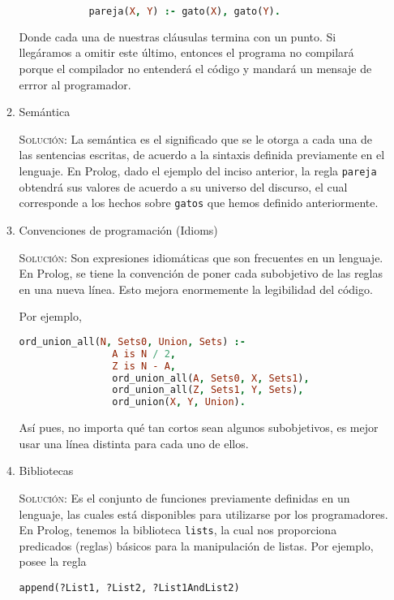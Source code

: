 \documentclass[letterpaper,11pt]{article}
\begin{document}
\begin{enumerate}
\begin{enumerate}
\begin{lstlisting}[language=Prolog]
            % Regla
            pareja(X, Y) :- gato(X), gato(Y).
        \end{lstlisting}
        
        Donde cada una de nuestras cláusulas termina con un punto. Si llegáramos
        a omitir este último, entonces el programa no compilará porque el 
        compilador no entenderá el código y mandará un mensaje de errror al 
        programador.

        \item Semántica

        \textsc{Solución:} La semántica es el significado que se le otorga a 
        cada una de las sentencias escritas, de acuerdo a la sintaxis definida 
        previamente en el lenguaje. En Prolog, dado el ejemplo del inciso 
        anterior, la regla \texttt{pareja} obtendrá sus valores de acuerdo a su 
        universo del discurso, el cual corresponde a los hechos sobre 
        \texttt{gatos} que hemos definido anteriormente. 

        \item Convenciones de programación (Idioms)

        \textsc{Solución:} Son expresiones idiomáticas que son frecuentes en un 
        lenguaje. En Prolog, se tiene la convención de poner cada subobjetivo de 
        las reglas en una nueva línea. Esto mejora enormemente la legibilidad 
        del código. 
        
        Por ejemplo, 
        \begin{lstlisting}[language=Prolog]
            ord_union_all(N, Sets0, Union, Sets) :-
                A is N / 2,
                Z is N - A, 
                ord_union_all(A, Sets0, X, Sets1),
                ord_union_all(Z, Sets1, Y, Sets),
                ord_union(X, Y, Union).
        \end{lstlisting}

        Así pues, no importa qué tan cortos sean algunos subobjetivos, es mejor 
        usar una línea distinta para cada uno de ellos. 

        \item Bibliotecas

        \textsc{Solución:} Es el conjunto de funciones previamente definidas 
        en un lenguaje, las cuales está disponibles para utilizarse por los 
        programadores. En Prolog, tenemos la biblioteca \texttt{lists}, la 
        cual nos proporciona predicados (reglas) básicos para la manipulación 
        de listas. Por ejemplo, posee la regla
        \begin{center}
            \texttt{append(?List1, ?List2, ?List1AndList2)}
        \end{center}  
        

\end{enumerate}
\end{enumerate}
\end{document}
